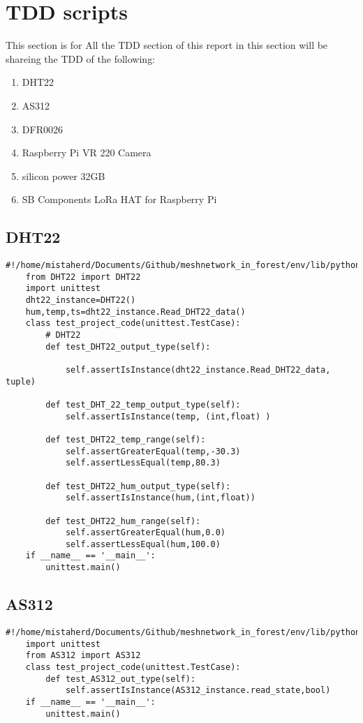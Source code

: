 \section{TDD scripts}
This section is  for All  the TDD section of  this  report in this  section will be  shareing the TDD of the following:
\begin{enumerate}
    \item DHT22
    \item AS312
    \item DFR0026
    \item Raspberry Pi VR 220 Camera
    \item silicon power 32GB
    \item SB Components LoRa HAT for Raspberry Pi
\end{enumerate}
\subsection{DHT22}
\begin{lstlisting}[style=mystyle,caption={DHT22 unit test}]
    #!/home/mistaherd/Documents/Github/meshnetwork_in_forest/env/lib/python3.11
    from DHT22 import DHT22
    import unittest
    dht22_instance=DHT22()
    hum,temp,ts=dht22_instance.Read_DHT22_data()
    class test_project_code(unittest.TestCase):
        # DHT22
        def test_DHT22_output_type(self):
           
            self.assertIsInstance(dht22_instance.Read_DHT22_data, tuple)
    
        def test_DHT_22_temp_output_type(self):
            self.assertIsInstance(temp, (int,float) )
    
        def test_DHT22_temp_range(self):
            self.assertGreaterEqual(temp,-30.3)
            self.assertLessEqual(temp,80.3)
    
        def test_DHT22_hum_output_type(self):
            self.assertIsInstance(hum,(int,float))
    
        def test_DHT22_hum_range(self):
            self.assertGreaterEqual(hum,0.0)
            self.assertLessEqual(hum,100.0) 
    if __name__ == '__main__':
        unittest.main() 
\end{lstlisting}
\newpage
\subsection{AS312}
\begin{lstlisting}[style=mystyle,caption={Code for unit test  of AS312}]
    #!/home/mistaherd/Documents/Github/meshnetwork_in_forest/env/lib/python3.11
    import unittest
    from AS312 import AS312
    class test_project_code(unittest.TestCase):
        def test_AS312_out_type(self):
            self.assertIsInstance(AS312_instance.read_state,bool)
    if __name__ == '__main__':
        unittest.main()
\end{lstlisting}
\newpage
